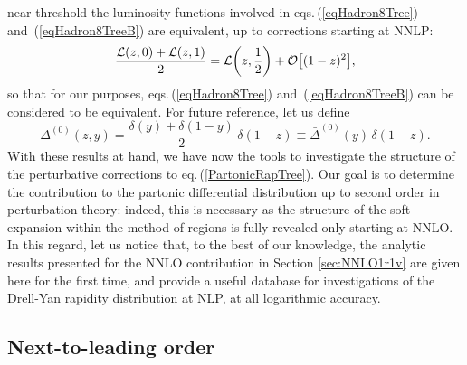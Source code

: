 \documentclass[11pt]{article}
\newcommand{\be}{\begin{equation}}
\newcommand{\ee}{\end{equation}}
\newcommand{\ord}{{\cal O}}
\newcommand\eqn[1]     {eq.\,(\ref{#1})}
\newcommand\eqns[2]    {eqs.\,(\ref{#1}) and~(\ref{#2})}
\begin{document}
near threshold the luminosity functions 
involved in \eqns{eqHadron8Tree}{eqHadron8TreeB}
are equivalent, up to corrections starting at 
NNLP:
\be\label{yEquivalenceNNLP}
\frac{{\cal L}(z,0) + {\cal L}(z,1)}{2} 
= {\cal L}\bigg(z,\frac{1}{2}\bigg) 
+\ord\big[(1-z)^2\big],
\ee
so that for our purposes,
\eqns{eqHadron8Tree}{eqHadron8TreeB}
can be considered to be equivalent.
For future reference, let us define 
\be\label{PartonicRapTreeBar} 
\Delta^{(0)}(z,y) = 
\frac{\delta(y)+\delta(1-y)}{2} \,
\delta(1-z) \equiv 
\bar \Delta^{(0)}(y) \, \delta(1-z).
\ee
With these results at hand, we have 
now the tools to investigate the 
structure of the perturbative
corrections to \eqn{PartonicRapTree}.
Our goal is to determine the contribution
to the partonic differential distribution 
up to second order in perturbation theory:
indeed, this is necessary as the structure 
of the soft expansion within the method of 
regions \cite{Beneke:1997zp} is fully 
revealed only starting at NNLO. In this 
regard, let us notice that, to the best of 
our knowledge, the analytic results 
presented for the NNLO contribution 
in Section \ref{sec:NNLO1r1v} are given 
here for the first time, and provide a 
useful database for investigations of 
the Drell-Yan rapidity distribution 
at NLP, at all logarithmic accuracy.



 


\subsection{Next-to-leading order}
\label{sec:NLO}
\end{document}
